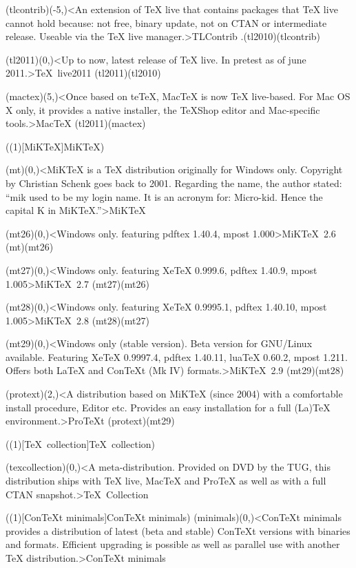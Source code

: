 {	\tonode(tlcontrib)(-5,\layer)<An extension of TeX live that contains packages that TeX live cannot hold because: not free, binary update, not on CTAN or intermediate release. Useable via the TeX live manager.>{TLContrib}
	\todraw.(tl2010)(tlcontrib)
	\steplayer

	\tonode(tl2011)(0,\layer)<Up to now, latest release of TeX live. In pretest as of june 2011.>{\TeX\ live2011}
	\todraw(tl2011)(tl2010)

	\tonode(mactex)(5,\layer)<Once based on teTeX, MacTeX is now TeX live-based. For Mac OS X only, it provides a native installer, the TeXShop editor and Mac-specific tools.>{Mac\TeX}
	\todraw(tl2011)(mactex)
}

\tograph(\tostruct(1)[MiK\TeX]{MiK\TeX}){
	\tonode(mt)(0,\layer)<MiKTeX is a TeX distribution originally for Windows only. Copyright by Christian Schenk goes back to 2001. Regarding the name, the author stated: “mik used to be my login name. It is an acronym for: Micro-kid. Hence the capital K in MiKTeX.”>{MiK\TeX}
	\steplayer

	\tonode(mt26)(0,\layer)<Windows only. featuring  pdftex 1.40.4, mpost 1.000>{MiK\TeX\ 2.6}
	\todraw(mt)(mt26)
	\steplayer

	\tonode(mt27)(0,\layer)<Windows only. featuring  XeTeX 0.999.6, pdftex 1.40.9, mpost 1.005>{MiK\TeX\ 2.7}
	\todraw(mt27)(mt26)
	\steplayer

	\tonode(mt28)(0,\layer)<Windows only. featuring  XeTeX 0.9995.1, pdftex 1.40.10, mpost 1.005>{MiK\TeX\ 2.8}
	\todraw(mt28)(mt27)
	\steplayer

	\tonode(mt29)(0,\layer)<Windows only (stable version). Beta version for GNU/Linux available. Featuring XeTeX 0.9997.4, pdftex 1.40.11, luaTeX 0.60.2, mpost 1.211. Offers both LaTeX and ConTeXt (Mk IV) formats.>{MiK\TeX\ 2.9}
	\todraw(mt29)(mt28)
	\steplayer	
	
	\tonode(protext)(2,\layer)<A distribution based on MiKTeX (since 2004) with a comfortable install procedure, Editor etc. Provides an easy installation for a full (La)TeX environment.>{ProTeXt}
	\todraw(protext)(mt29)
}

\tograph(\tostruct(1)[\TeX\ collection]{\TeX\ collection}){
	\tonode(texcollection)(0,\layer)<A meta-distribution. Provided on DVD by the TUG, this distribution ships with TeX live, MacTeX and ProTeX as well as with a full CTAN snapshot.>{\TeX\ Collection}

}

\tograph(\tostruct(1)[Con\TeX t minimals]{Con\TeX t minimals}){
	\tonode(minimals)(0,\layer)<ConTeXt minimals provides a distribution of latest (beta and stable) ConTeXt versions with binaries and formats. Efficient upgrading is possible as well as parallel use with another TeX distribution.>{Con\TeX t minimals}
}

